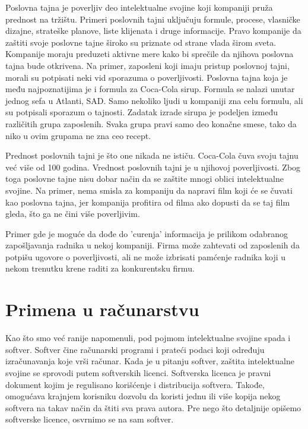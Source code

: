 \documentclass[a4paper]{article}
\begin{document}
Poslovna tajna je poverljiv deo intelektualne svojine koji kompaniji pruža prednost na tržištu. Primeri poslovnih tajni uključuju formule, procese, vlasničke dizajne, strateške planove, liste klijenata i druge informacije. Pravo kompanije da zaštiti svoje poslovne tajne široko su priznate od strane vlada širom sveta. Kompanije moraju preduzeti aktivne mere kako bi sprečile da njihova poslovna tajna bude otkrivena. Na primer, zaposleni koji imaju pristup poslovnoj tajni, morali su potpisati neki vid sporazuma o poverljivosti. Poslovna tajna koja je među najpoznatijima je i formula za Coca-Cola sirup. Formula se nalazi unutar jednog sefa u Atlanti, SAD. Samo nekoliko ljudi u kompaniji zna celu formulu, ali su potpisali sporazum o tajnosti. Zadatak izrade sirupa je podeljen između različitih grupa zaposlenih. Svaka grupa pravi samo deo konačne smese, tako da niko u ovim grupama ne zna ceo recept.

Prednost poslovnih tajni je što one nikada ne ističu. Coca-Cola čuva svoju tajnu već više od 100 godina.
Vrednost poslovnih tajni je u njihovoj poverljivosti. Zbog toga poslovne tajne nisu dobar način da se zaštite mnogi oblici intelektualne svojine. Na primer, nema smisla za kompaniju da napravi film koji će se čuvati kao poslovna tajna, jer kompanija profitira od filma ako dopusti da se taj film gleda, što ga ne čini više poverljivim.

Primer gde je moguće da dođe do 'curenja' informacija je prilikom odabranog zapošljavanja radnika u nekoj kompaniji. Firma može zahtevati od zaposlenih da potpišu ugovore o poverljivosti, ali ne može izbrisati pamćenje radnika koji u nekom trenutku krene raditi za konkurentsku firmu.

\section{Primena u računarstvu}
\label{primena_u_racuarstvu}

Kao što smo već ranije napomenuli, pod pojmom intelektualne svojine spada i softver.
Softver čine računarski programi i prateći podaci koji određuju izračunavanja koje vrši
računar. \cite{p1} Kada je u pitanju softver, zaštita intelektualne svojine se sprovodi putem
softverskih licenci.
Softverska licenca je pravni dokument kojim je regulisano korišćenje i
distribucija softvera. Takođe, omogućava krajnjem korisniku dozvolu da koristi jednu ili
više kopija nekog softvera na takav način da štiti sva prava autora. Pre nego što detaljnije
opišemo softverske licence, osvrnimo se na sam softver.
\end{document}
